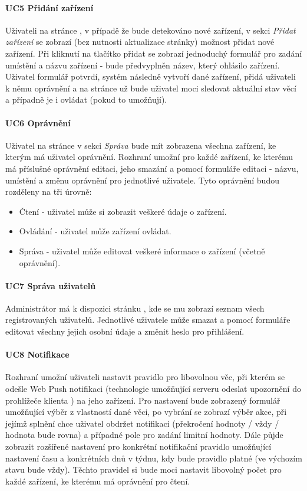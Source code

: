 \paragraph{UC5 Přidání zařízení}
\label{UC5}
Uživateli na stránce , v případě že bude detekováno nové zařízení, v sekci \textit{Přidat zařízení} se zobrazí (bez nutnosti aktualizace stránky) možnost přidat nové zařízení. Při kliknutí na tlačítko přidat se zobrazí jednoduchý formulář pro zadání umístění a názvu zařízení - bude předvyplněn název, který ohlásilo zařízení. Uživatel formulář potvrdí, systém následně vytvoří dané zařízení, přidá uživateli k němu oprávnění a na stránce  už bude uživatel moci sledovat aktuální stav věcí a případně je i ovládat (pokud to umožňují).

\paragraph{UC6 Oprávnění}
Uživatel na stránce  v sekci \textit{Správa} bude mít zobrazena všechna zařízení, ke kterým má uživatel oprávnění. Rozhraní umožní pro každé zařízení, ke kterému má příslušné oprávnění editaci, jeho smazání a pomocí formuláře editaci - názvu, umístění a změnu oprávnění pro jednotlivé uživatele. Tyto oprávnění budou rozděleny na tři úrovně:
\begin{itemize}
    \item Čtení - uživatel může si zobrazit veškeré údaje o zařízení.
    \item Ovládání - uživatel může zařízení ovládat.
    \item Správa - uživatel může editovat veškeré informace o zařízení (včetně oprávnění).
\end{itemize}

\paragraph{UC7 Správa uživatelů}
Administrátor má k dispozici stránku , kde se mu zobrazí seznam všech registrovaných uživatelů. Jednotlivé uživatele může smazat a pomocí formuláře editovat všechny jejich osobní údaje a změnit heslo pro přihlášení.

\paragraph{UC8 Notifikace}
Rozhraní umožní uživateli nastavit pravidlo pro libovolnou věc, při kterém se odešle Web Push notifikaci (technologie umožňující serveru odeslat upozornění do prohlížeče klienta \cite{web-push}) na jeho zařízení. Pro nastavení bude zobrazený formulář umožňující výběr z vlastností dané věci, po vybrání se zobrazí výběr akce, při jejímž splnění chce uživatel obdržet notifikaci (překročení hodnoty / vždy / hodnota bude rovna) a případné pole pro zadání limitní hodnoty. Dále půjde zobrazit rozšířené nastavení pro konkrétní notifikační pravidlo umožňující nastavení času a konkrétních dnů v týdnu, kdy bude pravidlo platné (ve výchozím stavu bude vždy). Těchto pravidel si bude moci nastavit libovolný počet pro každé zařízení, ke kterému má oprávnění pro čtení.




